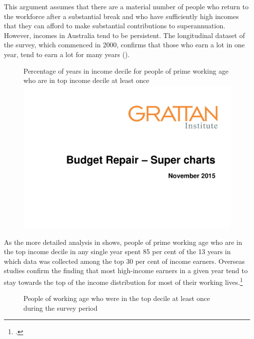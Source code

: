 \documentclass{grattanAlpha}
\begin{document}
This argument assumes that there are a material number of people who return to the workforce after a substantial break and who have sufficiently high incomes that they can afford to make substantial contributions to superannuation. However, incomes in Australia tend to be persistent. The longitudinal dataset of the \textcite{HILDA2015} survey, which commenced in 2000, confirms that those who earn a lot in one year, tend to earn a lot for many years ().
\begin{figure}
%
{Percentage of years in income decile for people of prime working age who are in top income decile at least once}\label{fig:SUPER-3-7}
\includegraphics[width=\columnwidth,page=16]{super-atlas/PPTX.pdf}

\end{figure}

As the more detailed analysis in  shows, people of prime working age who are in the top income decile in any single year spent 85 per cent of the 13 years in which data was collected among the top 30 per cent of income earners. Overseas studies confirm the finding that most high-income earners in a given year tend to stay towards the top of the income distribution for most of their working lives.\footcite[][56]{LevellRoantreeShaw2015}  

\begin{figure}
%
{People of working age who were in the top decile at least once during the \textcite{HILDA2015} survey period}\label{fig:SUPER-3-8}
\end{figure}
\end{document}
